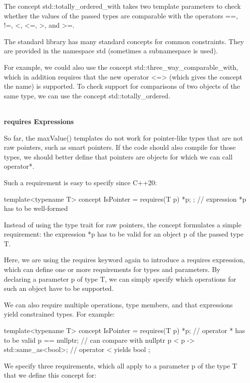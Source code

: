 The concept std::totally\_ordered\_with takes two template parameters to check whether the values of the passed types are comparable with the operators ==, !=, <, <=, >, and >=.

The standard library has many standard concepts for common constraints. They are provided in the namespace std (sometimes a subnamespace is used).

For example, we could also use the concept std::three\_way\_comparable\_with, which in addition requires that the new operator <=> (which gives the concept the name) is supported. To check support for comparisons of two objects of the same type, we can use the concept std::totally\_ordered.

\noindent
\hspace*{\fill} \\ %
\textbf{requires Expressions}

So far, the maxValue() templates do not work for pointer-like types that are not raw pointers, such as smart pointers. If the code should also compile for those types, we should better define that pointers are objects for which we can call operator*.

Such a requirement is easy to specify since C++20:

\begin{cpp}
template<typename T>
concept IsPointer = requires(T p) { *p; }; // expression *p has to be well-formed
\end{cpp}

Instead of using the type trait for raw pointers, the concept formulates a simple requirement: the expression *p has to be valid for an object p of the passed type T.

Here, we are using the requires keyword again to introduce a requires expression, which can define one or more requirements for types and parameters. By declaring a parameter p of type T, we can simply specify which operations for such an object have to be supported.

We can also require multiple operations, type members, and that expressions yield constrained types. For example:

\begin{cpp}
template<typename T>
concept IsPointer = requires(T p) {
	*p; // operator * has to be valid
	p == nullptr; // can compare with nullptr
	{p < p} -> std::same_as<bool>; // operator < yields bool
};
\end{cpp}

We specify three requirements, which all apply to a parameter p of the type T that we define this concept for:

